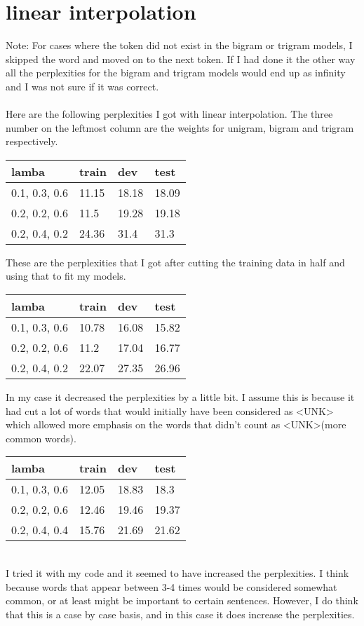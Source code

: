 \documentclass[12pt]{article}
\begin{document}
\section{linear interpolation}
Note: For cases where the token did not exist in the bigram or trigram models, I skipped the word and moved on to the next token. If I had done it the other way all the perplexities for the bigram and trigram models would end up as infinity and I was not sure if it was correct.\\\\
Here are the following perplexities I got with linear interpolation. The three number on the leftmost column are the weights for unigram, bigram and trigram respectively.
\begin{table}[!h]
\centering
\begin{tabular}{|l|l|l|l|}
\hline
lamba         & train & dev   & test  \\ \hline
0.1, 0.3, 0.6 & 11.15 & 18.18 & 18.09 \\ \hline
0.2, 0.2, 0.6 & 11.5  & 19.28 & 19.18 \\ \hline
0.2, 0.4, 0.2 & 24.36 & 31.4  & 31.3  \\ \hline
\end{tabular}
\end{table}
These are the perplexities that I got after cutting the training data in half and using that to fit my models.\\
\begin{table}[!h]
\centering
\begin{tabular}{|l|l|l|l|}
\hline
lamba         & train & dev   & test  \\ \hline
0.1, 0.3, 0.6 & 10.78 & 16.08 & 15.82 \\ \hline
0.2, 0.2, 0.6 & 11.2  & 17.04 & 16.77 \\ \hline
0.2, 0.4, 0.2 & 22.07 & 27.35 & 26.96 \\ \hline
\end{tabular}
\end{table}
In my case it decreased the perplexities by a little bit. I assume this is because it had cut a lot of words that would initially have been considered as <UNK> which allowed more emphasis on the words that didn't count as <UNK>(more common words).\\
\begin{table}[!h]
\centering
\begin{tabular}{|l|l|l|l|}
\hline
lamba         & train & dev   & test  \\ \hline
0.1, 0.3, 0.6 & 12.05 & 18.83 & 18.3  \\ \hline
0.2, 0.2, 0.6 & 12.46 & 19.46 & 19.37 \\ \hline
0.2, 0.4, 0.4 & 15.76 & 21.69 & 21.62 \\ \hline
\end{tabular}
\end{table}
\\I tried it with my code and it seemed to have increased the perplexities. I think because words that appear between 3-4 times would be considered somewhat common, or at least might be important to certain sentences. However, I do think that this is a case by case basis, and in this case it does increase the perplexities.
\end{document}
